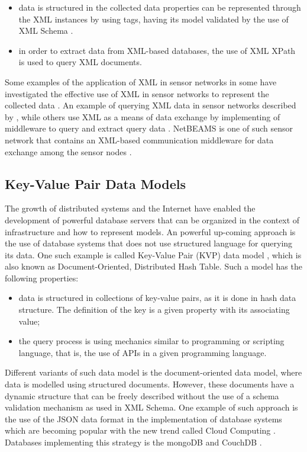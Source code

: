 \begin{itemize}
  \item data is structured in the collected data properties can be represented
  through the XML \cite{xml} instances by using tags, having its model validated
  by the use of XML Schema \cite{xml-schema}.
  \item in order to extract data from XML-based databases, the use of XML XPath
  \cite{xml-xpath} is used to query XML documents.
\end{itemize}

Some examples of the application of XML in sensor networks in
\cite{sn-xml-usage02} some have investigated the effective use of XML in
sensor networks to represent the collected data \cite{sn-xml-usage01}. An
example of querying XML data in sensor networks described by
\cite{sn-xml-query-engines}, while others use XML as a means of data exchange
by implementing of middleware to query and extract query data
\cite{sn-xml-middleware}. NetBEAMS is one of such sensor network that contains
an XML-based communication middleware for data exchange among the sensor nodes
\cite{netbeams2009}.

\subsection{Key-Value Pair Data Models}

The growth of distributed systems and the Internet have enabled the development
of powerful database servers that can be organized in the context of
infrastructure and how to represent models. An powerful up-coming approach is
the use of database systems that does not use structured language for querying
its data. One such example is called Key-Value Pair (KVP) data model
\cite{db-kvp}, which is also known as Document-Oriented, Distributed Hash
Table. Such a model has the following properties:

\begin{itemize}
  \item data is structured in collections of key-value pairs, as it is done in
  hash data structure. The definition of the key is a given property with its
  associating value;
  \item the query process is using mechanics similar to programming or
  scripting language, that is, the use of APIs in a given programming language.
\end{itemize}

Different variants of such data model is the document-oriented data model,
where data is modelled using structured documents. However, these documents
have a dynamic structure that can be freely described without the use of a
schema validation mechanism as used in XML Schema. One example of such approach
is the use of the JSON data format \cite{json} in the implementation of
database systems which are becoming popular with the new trend called Cloud
Computing \cite{cloud-comp-architectures}. Databases implementing this
strategy is the mongoDB \cite{mongodb} and CouchDB \cite{couchdb}.

